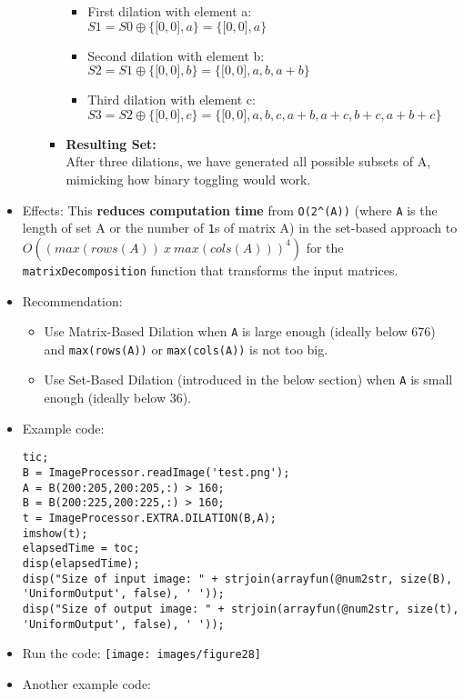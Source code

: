 \documentclass[11pt]{amsart}
\theoremstyle{remark}
\providecommand{\tightlist}{%
  \setlength{\itemsep}{0pt}\setlength{\parskip}{0pt}}
\theoremstyle{definition}
\theoremstyle{remark}
\numberwithin{equation}{section}
\begin{document}
\begin{itemize}
\begin{itemize}
\begin{itemize}
      \begin{itemize}
      \item
        First dilation with element a:\\
        ${{S1} = S0} \oplus \{{[}0,0{]}, a\} = \{{[}0,0{]}, a\}$
      \item
        Second dilation with element b:\\
        ${{S2} = S1} \oplus \{{[}0,0{]}, b\} = \{{[}0,0{]}, a, b, a+b\}$
      \item
        Third dilation with element c:\\
        ${{S3} = S2} \oplus \{{[}0,0{]}, c\} = \{{[}0,0{]}, a, b, c, a+b, a+c,
        b+c, a+b+c\}$
      \end{itemize}
    \item
      \textbf{Resulting Set:}\\
      After three dilations, we have generated all possible subsets of
      A, mimicking how binary toggling would work.
    \end{itemize}
  \end{itemize}
\item
  Effects: This \textbf{reduces computation time} from
  \texttt{O(2\^{}(\textbar{}A\textbar{}))} (where
  \texttt{\textbar{}A\textbar{}} is the length of set A or the number of
  \texttt{1}s of matrix A) in the set-based approach to
  \texttt{$O((max(rows(A))\ x\ max(cols(A)))^4)$} for the
  \texttt{matrixDecomposition} function that transforms the input
  matrices.
\item
  Recommendation:

  \begin{itemize}
  \tightlist
  \item
    Use Matrix-Based Dilation when \texttt{\textbar{}A\textbar{}} is
    large enough (ideally below 676) and \texttt{max(rows(A))} or
    \texttt{max(cols(A))} is not too big.
  \item
    Use Set-Based Dilation (introduced in the below section) when
    \texttt{\textbar{}A\textbar{}} is small enough (ideally below 36).
  \end{itemize}
\item
  Example code:

\begin{verbatim}
tic;
B = ImageProcessor.readImage('test.png');
A = B(200:205,200:205,:) > 160;
B = B(200:225,200:225,:) > 160;
t = ImageProcessor.EXTRA.DILATION(B,A);
imshow(t);
elapsedTime = toc;
disp(elapsedTime);
disp("Size of input image: " + strjoin(arrayfun(@num2str, size(B), 'UniformOutput', false), ' '));
disp("Size of output image: " + strjoin(arrayfun(@num2str, size(t), 'UniformOutput', false), ' '));
\end{verbatim}
\item
  Run the code:
  \texttt{[image: images/figure28]}\\
\item
  Another example code:


\end{itemize}
\end{document}
